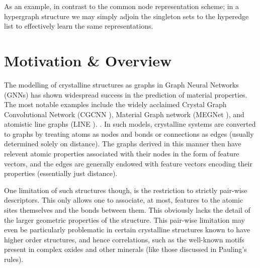 \documentclass{article}
\begin{document}
As an example, in contrast to the common node representation scheme; in a hypergraph structure we may simply adjoin the singleton sets to the hyperedge list to effectively learn the same representations.







\section{Motivation \& Overview}
The modelling of crystalline structures as graphs in Graph Neural Networks (GNNs) has shown widespread success in the prediction of material properties. The most notable examples include the widely acclaimed Crystal Graph Convolutional Network (CGCNN \cite{xie2018crystal}), Material Graph network (MEGNet \cite{chen2019graph}), and atomistic line graphs (LINE \cite{choudhary2021atomistic}).
. 
In such models, crystalline systems are converted to graphs by treating atoms as nodes and bonds or connections as edges (usually determined solely on distance). The graphs derived in this manner then have relevent atomic properties associated with their nodes in the form of feature vectors, and the edges are generally endowed with feature vectors encoding their properties (essentially just distance).

One limitation of such structures though, is the restriction to strictly pair-wise descriptors. This only allows one to associate, at most, features to the atomic sites themselves and the bonds between them. This obviously lacks the detail of the larger geometric properties of the structure. This pair-wise limitation may even be particularly problematic in certain crystalline structures known to have higher order structures, and hence correlations, such as the well-known motifs present in complex oxides and other minerals (like those discussed in Pauling's rules). 
\end{document}
